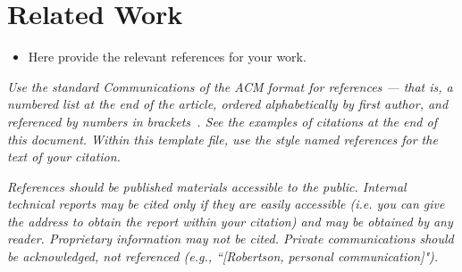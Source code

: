 \documentclass[sigconf]{acmart}
\begin{document}

\section{Related Work}
\begin{itemize}
    \item Here provide the relevant references for your work. 
\end{itemize}
	
\emph{Use the standard Communications of the ACM format for references --- that is, a numbered list at the end of the article, ordered alphabetically by first author, and referenced by numbers in brackets~\cite{anderson1992social}. See the examples of citations at the end of this document. Within this template file, use the style named references for the text of your citation.}

\emph{References should be published materials accessible to the public. Internal technical reports may be cited only if they are easily accessible (i.e. you can give the address to obtain the report within your citation) and may be obtained by any reader. Proprietary information may not be cited. Private communications should be acknowledged, not referenced  (e.g., ``[Robertson, personal communication]").}




\end{document}

